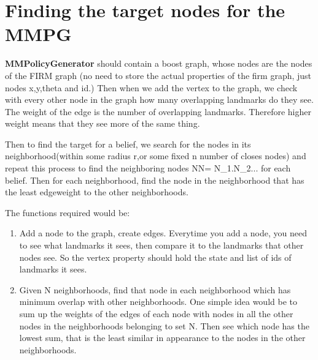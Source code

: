 \section{Finding the target nodes for the MMPG}

\textbf{MMPolicyGenerator} should contain a boost graph, whose nodes are the nodes of the FIRM graph (no need to store the
actual properties of the firm graph, just nodes x,y,theta and id.) Then when we add
the vertex to the graph, we check with every other node in the graph how many overlapping
landmarks do they see. The weight of the edge is the number of overlapping landmarks.
Therefore higher weight means that they see more of the same thing.

Then to find the target for a belief, we search for the nodes in its neighborhood(within some radius r,or some fixed
n number of closes nodes) and repeat this process to find the neighboring nodes NN= {N_1.N_2...} for each belief.
Then for each neighborhood, find the node in the neighborhood that has the least edgeweight to the other neighborhoods.


The functions required would be:

\begin{enumerate}
 \item Add a node to the graph, create edges. Everytime you add a node, you need to see what landmarks it sees, then compare it to the landmarks
      that other nodes see. So the vertex property should hold the state and list of ids of landmarks it sees.
 \item Given N neighborhoods, find that node in each neighborhood which has minimum overlap with other neighborhoods. One simple idea would be 
       to sum up the weights of the edges of each node with nodes in all the other nodes in the neighborhoods belonging to set N. Then
       see which node has the lowest sum, that is the least similar in appearance to the nodes in the other neighborhoods.
\end{enumerate}
